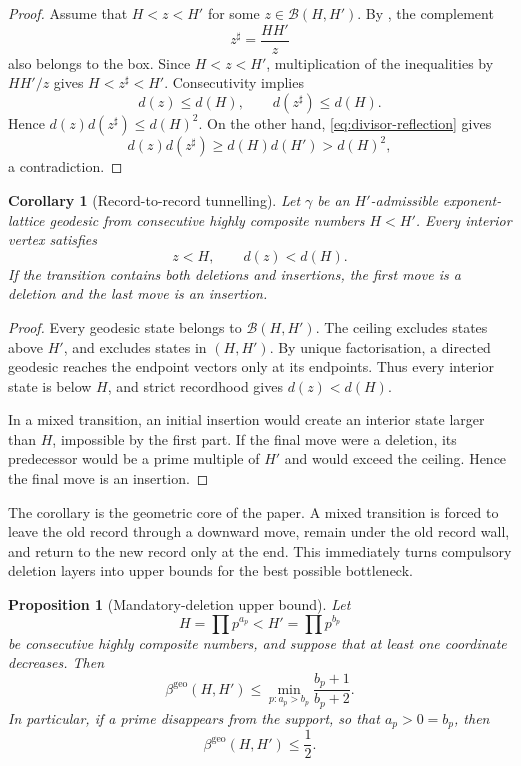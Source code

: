 \documentclass[11pt]{article}
\numberwithin{equation}{section}
\theoremstyle{blueplain}
\newtheorem{proposition}[theorem]{Proposition}
\newtheorem{corollary}[theorem]{Corollary}
\theoremstyle{bluedef}
\newcommand{\Bcal}{\mathcal B}
\newcommand{\betageo}{\beta^{\mathrm{geo}}}
\begin{document}
\begin{proof}
Assume that $H<z<H'$ for some $z\in\Bcal(H,H')$.  By , the complement
\[
 z^\sharp=\frac{HH'}{z}
\]
also belongs to the box.  Since $H<z<H'$, multiplication of the inequalities by $HH'/z$ gives $H<z^\sharp<H'$.  Consecutivity implies
\[
 d(z)\le d(H),
 \qquad
 d(z^\sharp)\le d(H).
\]
Hence $d(z)d(z^\sharp)\le d(H)^2$.  On the other hand, \eqref{eq:divisor-reflection} gives
\[
 d(z)d(z^\sharp)\ge d(H)d(H')>d(H)^2,
\]
a contradiction.
\end{proof}

\begin{corollary}[Record-to-record tunnelling]
\label{cor:tunnelling}
Let $\gamma$ be an $H'$-admissible exponent-lattice geodesic from consecutive highly composite numbers $H<H'$.  Every interior vertex satisfies
\begin{equation}
 z<H,
 \qquad
 d(z)<d(H).
 \label{eq:tunnel-below}
\end{equation}
If the transition contains both deletions and insertions, the first move is a deletion and the last move is an insertion.
\end{corollary}

\begin{proof}
Every geodesic state belongs to $\Bcal(H,H')$.  The ceiling excludes states above $H'$, and  excludes states in $(H,H')$.  By unique factorisation, a directed geodesic reaches the endpoint vectors only at its endpoints.  Thus every interior state is below $H$, and strict recordhood gives $d(z)<d(H)$.

In a mixed transition, an initial insertion would create an interior state larger than $H$, impossible by the first part.  If the final move were a deletion, its predecessor would be a prime multiple of $H'$ and would exceed the ceiling.  Hence the final move is an insertion.
\end{proof}

The corollary is the geometric core of the paper.  A mixed transition is forced to leave the old record through a downward move, remain under the old record wall, and return to the new record only at the end.  This immediately turns compulsory deletion layers into upper bounds for the best possible bottleneck.

\begin{proposition}[Mandatory-deletion upper bound]
\label{prop:mandatory-deletion-upper}
Let
\[
 H=\prod p^{a_p}<H'=\prod p^{b_p}
\]
be consecutive highly composite numbers, and suppose that at least one coordinate decreases.  Then
\begin{equation}
 \boxed{
 \betageo(H,H')\le
 \min_{p:a_p>b_p}\frac{b_p+1}{b_p+2}.}
 \label{eq:mandatory-deletion-upper}
\end{equation}
In particular, if a prime disappears from the support, so that $a_p>0=b_p$, then
\begin{equation}
 \betageo(H,H')\le\frac12.
 \label{eq:support-loss-upper}
\end{equation}
\end{proposition}
\end{document}
